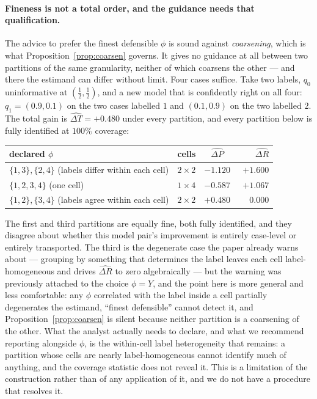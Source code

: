 \documentclass[preprint,times,10pt,a4paper]{elsarticle}
\theoremstyle{plain}
\theoremstyle{definition}
\begin{document}
\paragraph{Fineness is not a total order, and the guidance needs that qualification.}
The advice to prefer the finest defensible $\phi$ is sound against \emph{coarsening},
which is what Proposition~\ref{prop:coarsen} governs. It gives no guidance at all between
two partitions of the same granularity, neither of which coarsens the other --- and there
the estimand can differ without limit. Four cases suffice. Take two labels, $q_0$
uninformative at $(\tfrac12,\tfrac12)$, and a new model that is confidently right on all
four: $q_1=(0.9,0.1)$ on the two cases labelled $1$ and $(0.1,0.9)$ on the two labelled
$2$. The total gain is $\widehat{\Delta T}=+0.480$ under every partition, and every
partition below is fully identified at $100\%$ coverage:
\begin{center}
\begin{tabular}{@{}lccr@{}}
\toprule
declared $\phi$ & cells & $\widehat{\Delta P}$ & $\widehat{\Delta R}$ \\
\midrule
$\{1,3\},\{2,4\}$ (labels differ within each cell) & $2\times2$ & $-1.120$ & $+1.600$ \\
$\{1,2,3,4\}$ (one cell)                           & $1\times4$ & $-0.587$ & $+1.067$ \\
$\{1,2\},\{3,4\}$ (labels agree within each cell)  & $2\times2$ & $+0.480$ & $\phantom{+}0.000$ \\
\bottomrule
\end{tabular}
\end{center}
The first and third partitions are equally fine, both fully identified, and they disagree
about whether this model pair's improvement is entirely case-level or entirely
transported. The third is the degenerate case the paper already warns about --- grouping
by something that determines the label leaves each cell label-homogeneous and drives
$\widehat{\Delta R}$ to zero algebraically --- but the warning was previously attached to
the choice $\phi=Y$, and the point here is more general and less comfortable: any $\phi$
correlated with the label inside a cell partially degenerates the estimand, ``finest
defensible'' cannot detect it, and Proposition~\ref{prop:coarsen} is silent because
neither partition is a coarsening of the other. What the analyst actually needs to
declare, and what we recommend reporting alongside $\phi$, is the within-cell label
heterogeneity that remains: a partition whose cells are nearly label-homogeneous cannot
identify much of anything, and the coverage statistic does not reveal it. This is a
limitation of the construction rather than of any application of it, and we do not have a
procedure that resolves it.
\end{document}

